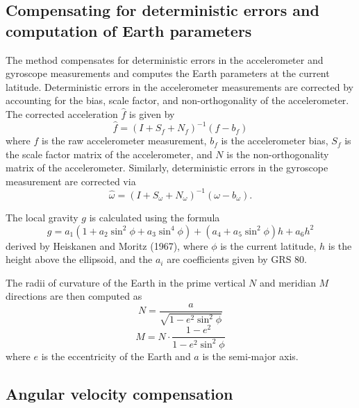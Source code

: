 \documentclass[11pt, oneside]{article}   	%
\begin{document}
\subsection{Compensating for deterministic errors and computation of Earth parameters}
The  method compensates for deterministic errors in the accelerometer and gyroscope measurements and computes the Earth parameters at the current latitude.  Deterministic errors in the accelerometer measurements are corrected by accounting for the bias, scale factor, and non-orthogonality of the accelerometer.  The corrected acceleration $\hat f$ is given by 
\begin{equation}
\hat f=(I+S_f+N_f)^{-1}(f-b_f)
\end{equation}
where $f$ is the raw accelerometer measurement, $b_f$ is the accelerometer bias, $S_f$ is the scale factor matrix of the accelerometer, and $N$ is the non-orthogonality matrix of the accelerometer.  Similarly, deterministic errors in the gyroscope measurement are corrected via 
\begin{equation}
\hat \omega=(I+S_\omega+N_\omega)^{-1}(\omega-b_\omega).
\end{equation}

The local gravity $g$ is calculated using the formula
\begin{equation}
g=a_1(1+a_2\sin^2\phi+a_3\sin^4\phi)+(a_4+a_5\sin^2\phi)h+a_6h^2
\end{equation}
derived by Heiskanen and Moritz (1967), where $\phi$ is the current latitude, $h$ is the height above the ellipsoid, and the $a_i$ are coefficients given by GRS 80.

The radii of curvature of the Earth in the prime vertical $N$ and meridian $M$ directions are then computed as 
\begin{equation}
N=\frac{a}{\sqrt{1-e^2\sin^2\phi}}
\end{equation}
\begin{equation}
M=N\cdot \frac{1-e^2}{1-e^2\sin^2\phi}
\end{equation}
where $e$ is the eccentricity of the Earth and $a$ is the semi-major axis.

\subsection{Angular velocity compensation}
\end{document}

